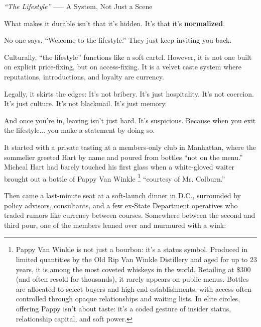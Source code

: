 \begin{HistoricalSidebar}{\textit{“The Lifestyle”} --— A System, Not Just a Scene}
  \medskip
  
  What makes it durable isn’t that it’s hidden.  It’s that it’s \textbf{normalized}.

  \medskip
  
  No one says, “Welcome to the lifestyle.” They just keep inviting you back.
  
  \medskip
  
  Culturally, “the lifestyle” functions like a soft cartel. However, it is not one built on explicit price-fixing, 
  but on access-fixing. It is a velvet caste system where reputations, introductions, and loyalty are currency.
  
  \medskip
  
  Legally, it skirts the edges:
  It's not bribery. It's just hospitality.
  It's not coercion. It's just culture.
  It's not blackmail. It's just memory.
  
  \medskip
  
  And once you’re in, leaving isn’t just hard. It’s suspicious.  Because when you exit the lifestyle...  
  you make a statement by doing so.
  
\end{HistoricalSidebar}

\medskip

It started with a private tasting at a members-only club in Manhattan, where the sommelier greeted Hart by name and poured 
from bottles ``not on the menu.'' Micheal Hart had barely touched his first glass when a white-gloved waiter brought out a 
bottle of Pappy Van Winkle
\footnote{Pappy Van Winkle is not just a bourbon: it's a status symbol. Produced in limited quantities by the Old Rip Van 
Winkle Distillery and aged for up to 23 years, it is among the most coveted whiskeys in the world. Retailing at \$300 
(and often resold for thousands), it rarely appears on public menus. Bottles are allocated to select buyers and high-end 
establishments, with access often controlled through opaque relationships and waiting lists. In elite circles, offering 
Pappy isn't about taste: it's a coded gesture of insider status, relationship capital, and soft power.}
 ``courtesy of Mr. Colburn.''

Then came a last-minute seat at a soft-launch dinner in D.C., surrounded by policy advisors, consultants, and a few ex-State 
Department operatives who traded rumors like currency between courses. Somewhere between the second and third pour, one of the 
members leaned over and murmured with a wink:  

